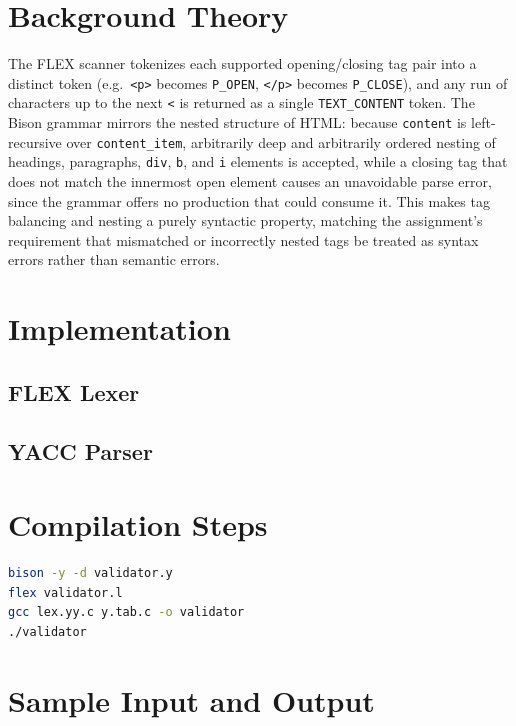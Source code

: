 \documentclass{article}
\begin{document}
\section{Background Theory}
The FLEX scanner tokenizes each supported opening/closing tag pair into a distinct token (e.g.\ \texttt{<p>} becomes \texttt{P\_OPEN}, \texttt{</p>} becomes \texttt{P\_CLOSE}), and any run of characters up to the next \texttt{<} is returned as a single \texttt{TEXT\_CONTENT} token. The Bison grammar mirrors the nested structure of HTML: because \texttt{content} is left-recursive over \texttt{content\_item}, arbitrarily deep and arbitrarily ordered nesting of headings, paragraphs, \texttt{div}, \texttt{b}, and \texttt{i} elements is accepted, while a closing tag that does not match the innermost open element causes an unavoidable parse error, since the grammar offers no production that could consume it. This makes tag balancing and nesting a purely syntactic property, matching the assignment's requirement that mismatched or incorrectly nested tags be treated as syntax errors rather than semantic errors.

\section{Implementation}

\subsection{FLEX Lexer}


\subsection{YACC Parser}


\section{Compilation Steps}
\begin{lstlisting}[language=bash, caption=Build and Run]
bison -y -d validator.y
flex validator.l
gcc lex.yy.c y.tab.c -o validator
./validator
\end{lstlisting}

\section{Sample Input and Output}
\end{document}
